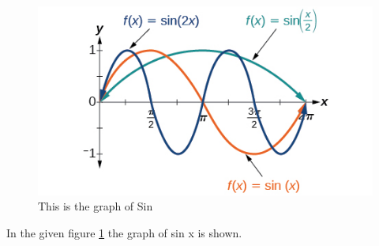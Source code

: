 \documentclass{article}
\begin{document}
\begin{figure}[htb!]
	\centering
	\caption{This is the graph of Sin}
	\label{fig:singraph}
\includegraphics[scale=0.5]{sin}
\end{figure}


In the given figure \ref{fig:singraph} the graph of sin x is shown.
\end{document}
